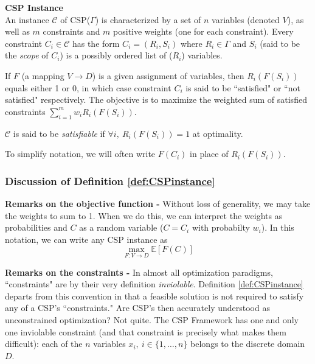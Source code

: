 \begin{definition}
\textbf{CSP Instance}\\
An instance $\mathcal{C}$ of CSP($\Gamma$) is characterized by a set of $n$ variables (denoted $V$), as well as $m$ constraints and $m$ positive weights (one for each constraint). 
Every constraint $C_i \in \mathcal{C}$ has the form $C_i = (R_i,S_i)$ where $R_i \in \Gamma$ and $S_i$ (said to be the \textit{scope} of $C_i$) is a possibly ordered list of ($R_i$) variables. 

If $F$ (a mapping $ V\to D$) is a given assignment of variables, then $R_i(F(S_i))$ equals either 1 or 0, in which case constraint $C_i$ is said to be ``satisfied" or ``not satisfied" respectively.
The objective is to maximize the weighted sum of satisfied constraints $\sum_{i = 1}^m w_i R_i(F(S_i))$. 

$\mathcal{C}$ is said to be \textit{satisfiable} if $\forall i, ~ R_i(F(S_i)) = 1$ at optimality.
\label{def:CSPinstance}
\end{definition}
To simplify notation, we will often write $F(C_i)$ in place of $R_i(F(S_i))$.

\subsubsection{Discussion of Definition \ref{def:CSPinstance}}
\textbf{Remarks on the objective function - }Without loss of generality, we may take the weights to sum to 1. 
When we do this, we can interpret the weights as probabilities and $C$ as a random variable ($C = C_i$ with probabilty $w_i$). 
In this notation, we can write any CSP instance as
\begin{equation}
\max_{F: V \to D} \mathbb{E}\left[F(C)\right]
\end{equation}

\textbf{Remarks on the constraints - }In almost all optimization paradigms, ``constraints" are by their very definition \textit{inviolable}. 
Definition \ref{def:CSPinstance} departs from this convention in that a feasible solution is not required to satisfy any of a CSP's ``constraints." 
Are CSP's then accurately understood as unconstrained optimization? 
Not quite. 
The CSP Framework has one and only one inviolable constraint (and that constraint is precisely what makes them difficult): each of the $n$ variables $x_i, ~ i \in\{1,\ldots,n\}$ belongs to the discrete domain $D$. 

